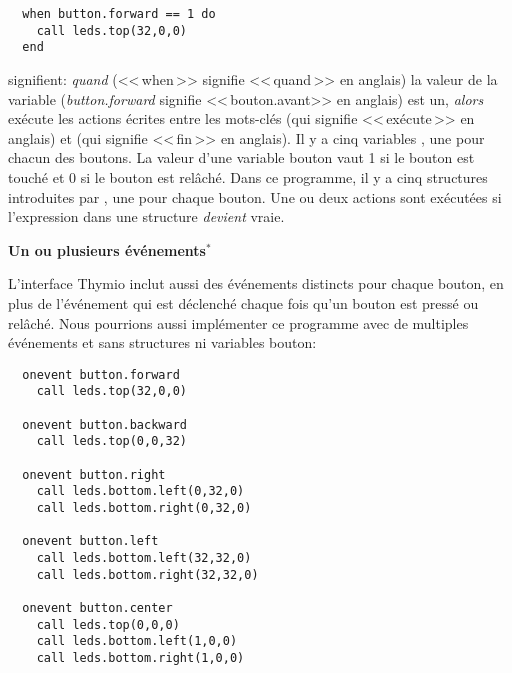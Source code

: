 \begin{footnotesize}
\begin{verbatim}
  when button.forward == 1 do
    call leds.top(32,0,0)
  end
\end{verbatim}
\end{footnotesize}

signifient: \emph{quand} (<<\,when\,>> signifie <<\,quand\,>> en anglais) la valeur de la variable  (\emph{button.forward} signifie
<<\,bouton.avant>> en anglais) est un,
\emph{alors} exécute les actions écrites entre les mots-clés  (qui signifie <<\,exécute\,>> en anglais)
et  (qui signifie <<\,fin\,>> en anglais).
Il y a cinq variables , une pour chacun des boutons.
La valeur d'une variable bouton vaut 1 si le bouton est touché et 0 si le bouton est relâché.
Dans ce programme, il y a cinq structures introduites par , une pour chaque bouton.
Une ou deux actions sont exécutées si l'expression dans une structure  \emph{devient} vraie.


\textbf{\large Un ou plusieurs événements$^*$}

L'interface Thymio inclut aussi des événements distincts pour chaque bouton,
en plus de l'événement  qui est déclenché chaque fois qu'un bouton est pressé ou relâché.
Nous pourrions aussi implémenter ce programme avec de multiples événements et sans structures
 ni variables bouton:

\begin{footnotesize}
\begin{verbatim}
  onevent button.forward
    call leds.top(32,0,0)
  
  onevent button.backward
    call leds.top(0,0,32)
  
  onevent button.right
    call leds.bottom.left(0,32,0)
    call leds.bottom.right(0,32,0)
  
  onevent button.left
    call leds.bottom.left(32,32,0)
    call leds.bottom.right(32,32,0)
  
  onevent button.center
    call leds.top(0,0,0)
    call leds.bottom.left(1,0,0)
    call leds.bottom.right(1,0,0)
\end{verbatim}
\end{footnotesize}

